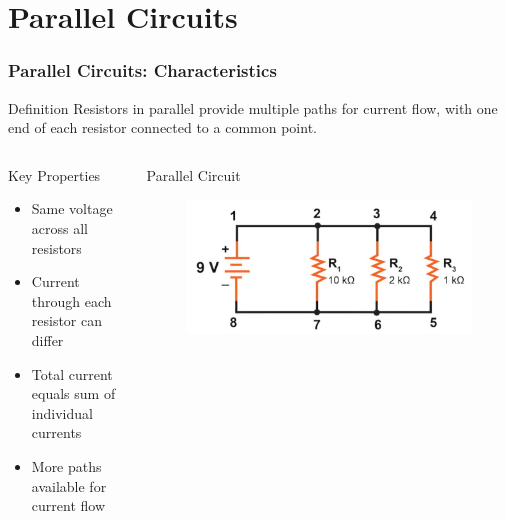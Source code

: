 \documentclass{beamer}
\begin{document}
\section{Parallel Circuits}

\begin{frame}
\frametitle{Parallel Circuits: Characteristics}
\begin{block}{Definition}
Resistors in parallel provide multiple paths for current flow, with one end of each resistor connected to a common point.
\end{block}

\begin{columns}
\begin{block}{Key Properties}
\begin{itemize}
\item Same voltage across all resistors
\item Current through each resistor can differ
\item Total current equals sum of individual currents
\item More paths available for current flow
\end{itemize}
\end{block}

\begin{alertblock}{Parallel Circuit}
\alert{}
\begin{figure}
    \centering
    \includegraphics[width=1\linewidth]{phys11-circuits-parallel-resistors.png}
\end{figure}
\end{alertblock}
\end{columns}
\end{frame}
\end{document}
